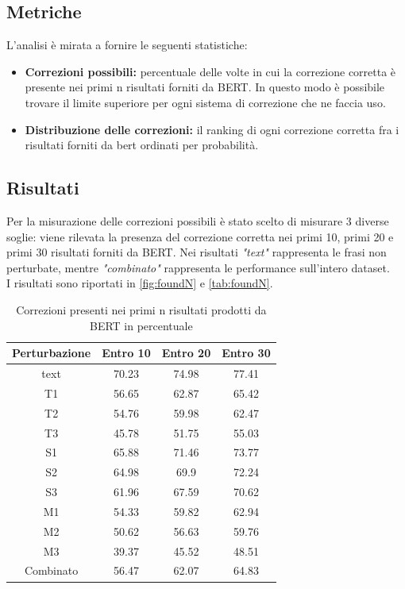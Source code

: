 \documentclass[12pt]{article}
\begin{document}
\subsection{Metriche}
L'analisi è mirata a fornire le seguenti statistiche:
\begin{itemize}
\item \textbf{Correzioni possibili:} percentuale delle volte in cui la correzione corretta è presente nei primi n risultati forniti da BERT. In questo modo è possibile trovare il limite superiore per ogni sistema di correzione che ne faccia uso.
\item \textbf{Distribuzione delle correzioni:} il ranking di ogni correzione corretta fra i risultati forniti da bert ordinati per probabilità.
\end{itemize}

\subsection{Risultati}
Per la misurazione delle correzioni possibili è stato scelto di misurare 3 diverse soglie: viene rilevata la presenza del correzione corretta nei primi 10, primi 20 e primi 30 risultati forniti da BERT. Nei risultati \textit{"text"} rappresenta le frasi non perturbate, mentre \textit{"combinato"} rappresenta le performance sull'intero dataset. \\
I risultati sono riportati in \autoref{fig:foundN} e \autoref{tab:foundN}.

\begin{table}[H]
\centering
\begin{tabular}{cccc}
\textbf{Perturbazione} & \textbf{Entro 10} & \textbf{Entro 20} & \textbf{Entro 30} \\ \hline
text& 70.23& 74.98& 77.41\\
T1& 56.65& 62.87& 65.42\\
T2& 54.76& 59.98& 62.47\\
T3& 45.78& 51.75& 55.03\\
S1& 65.88& 71.46& 73.77\\
S2& 64.98& 69.9& 72.24\\
S3& 61.96& 67.59& 70.62\\
M1& 54.33& 59.82& 62.94\\
M2& 50.62& 56.63& 59.76\\
M3& 39.37& 45.52& 48.51\\
Combinato& 56.47& 62.07& 64.83\\
\end{tabular}
\caption{Correzioni presenti nei primi n risultati prodotti da BERT in percentuale}
\label{tab:foundN}
\end{table}
\end{document}
